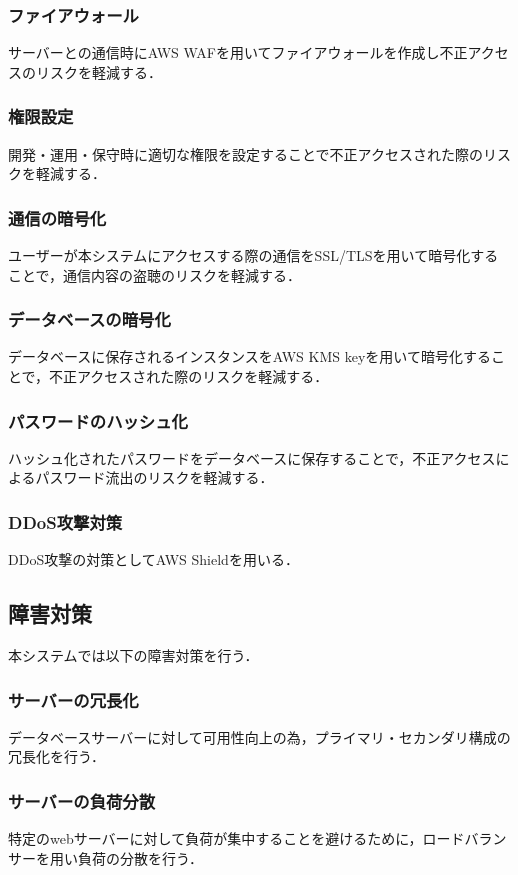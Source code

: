 \documentclass[a4paper, titlepage]{jsarticle}
\begin{document}
\subsubsection{ファイアウォール}
サーバーとの通信時にAWS WAFを用いてファイアウォールを作成し不正アクセスのリスクを軽減する．
\subsubsection{権限設定}
開発・運用・保守時に適切な権限を設定することで不正アクセスされた際のリスクを軽減する．
\subsubsection{通信の暗号化}
ユーザーが本システムにアクセスする際の通信をSSL/TLSを用いて暗号化することで，通信内容の盗聴のリスクを軽減する．
\subsubsection{データベースの暗号化}
データベースに保存されるインスタンスをAWS KMS keyを用いて暗号化することで，不正アクセスされた際のリスクを軽減する．
\subsubsection{パスワードのハッシュ化}
ハッシュ化されたパスワードをデータベースに保存することで，不正アクセスによるパスワード流出のリスクを軽減する．
\subsubsection{DDoS攻撃対策}
DDoS攻撃の対策としてAWS Shieldを用いる．
\subsection{障害対策}
本システムでは以下の障害対策を行う．
\subsubsection{サーバーの冗長化}
データベースサーバーに対して可用性向上の為，プライマリ・セカンダリ構成の冗長化を行う．
\subsubsection{サーバーの負荷分散}
特定のwebサーバーに対して負荷が集中することを避けるために，ロードバランサーを用い負荷の分散を行う．


\end{document}
